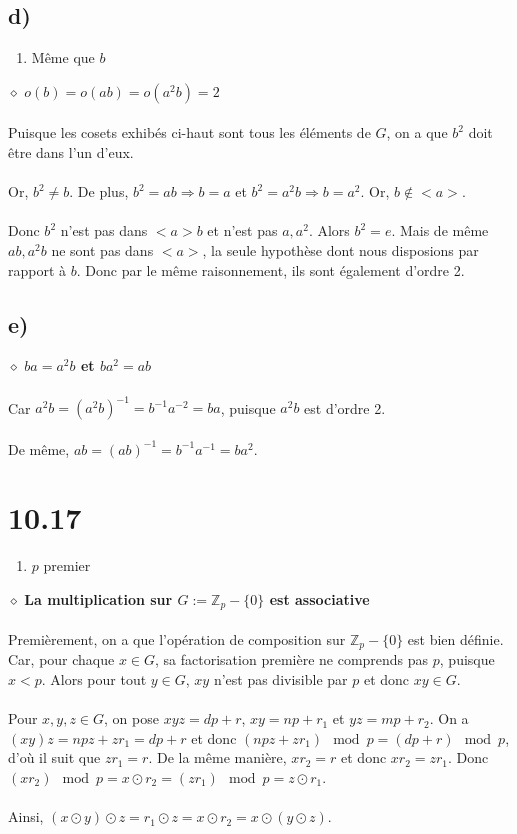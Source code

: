 \documentclass[a4paper,10pt]{article}
\begin{document}
\subsection*{d)}
\begin{enumerate}
 \item Même que $b$
\end{enumerate}
$\diamond$ \textbf{$o(b) = o(ab) = o(a^2 b) = 2$}
\\
\\
Puisque les cosets exhibés ci-haut sont tous les éléments de $G$, on a que $b^2$ doit être dans l'un d'eux.
\\
\\
Or, $b^2 \not = b$. De plus, $b^2 = ab \Rightarrow b = a$ et $b^2 = a^2 b \Rightarrow b = a^2$. Or, $b \not \in <a>$.
\\
\\
Donc $b^2$ n'est pas dans $<a>b$ et n'est pas $a,a^2$. Alors $b^2 = e$. Mais de même $ab, a^2b$ ne sont pas dans $<a>$, la 
seule hypothèse dont nous disposions par rapport à $b$. Donc par le même raisonnement, ils sont également d'ordre 2.

\subsection*{e)}
$\diamond$ \textbf{$ba = a^2 b$ et $ba^2 = ab$}
\\
\\
Car $a^2 b = (a^2 b)^{-1} = b^{-1}a^{-2} = ba$, puisque $a^2 b$ est d'ordre 2. 
\\
\\
De même, $ab = (ab)^{-1} = b^{-1}a^{-1} = ba^2$.

\section*{10.17}
\begin{enumerate}
 \item $p$ premier
\end{enumerate}
$\diamond$ \textbf{La multiplication sur $G := \mathbb{Z}_p - \{0\}$ est associative}
\\
\\
Premièrement, on a que l'opération de composition sur $\mathbb{Z}_p - \{0\}$ est bien définie. Car, pour chaque $x \in G$, sa factorisation
première ne comprends pas $p$, puisque $x < p$. Alors pour tout $y \in G$, $xy$ n'est pas divisible par $p$ et donc $xy \in G$.
\\
\\
Pour $x,y,z \in G$, on pose $xyz = dp + r$, $xy = np + r_1$ et $yz = mp + r_2$. On a $(xy)z = npz + z r_1 = dp + r$ et donc
$(npz + z r_1) \mod{p} = (dp + r) \mod{p}$, d'où il suit que $z r_1 = r$. De la même manière, $x r_2 = r$ et donc $x r_2 = z r_1$. Donc
$(x r_2) \mod{p} = x \odot r_2 = (z r_1) \mod{p} = z \odot r_1$. 
\\
\\
Ainsi, $(x \odot y) \odot z = r_1 \odot z = x \odot r_2 = x \odot (y \odot z)$.
\end{document}
